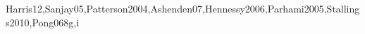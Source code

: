 \begin{syllabus}
\begin{unit}{\ARPerformanceenhancements}{}{Harris12,Sanjay05,Patterson2004,Ashenden07,Hennessy2006,Parhami2005,Stallings2010,Pong06}{8}{g,i}
\begin{topics}
	\item \ARPerformanceenhancementsTopicSuperscalar
	\item \ARPerformanceenhancementsTopicBranch
	\item \ARPerformanceenhancementsTopicPrefetching
	\item \ARPerformanceenhancementsTopicVector
	\item \ARPerformanceenhancementsTopicHardware
	\item \ARPerformanceenhancementsTopicScalability
	\item \ARPerformanceenhancementsTopicAlternative
\end{topics}

\begin{learningoutcomes}
  \item \ARPerformanceenhancementsLODescribeSuperscalar [\Familiarity]
  \item \ARPerformanceenhancementsLOExplainTheBranch [\Usage]
  \item \ARPerformanceenhancementsLOCharacterize [\Assessment]
  \item \ARPerformanceenhancementsLOExplainSpeculative [\Assessment]
  \item \ARPerformanceenhancementsLODiscussTheThatIn [\Assessment]
  \item \ARPerformanceenhancementsLODescribeTheScalability [\Assessment]
\end{learningoutcomes}
\end{unit}

\begin{coursebibliography}
\end{coursebibliography}

\end{syllabus}

